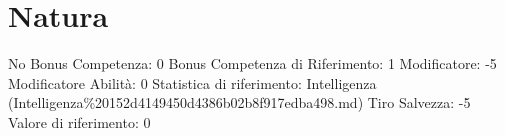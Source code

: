 \section{Natura}\label{natura}

\begin{description}
\tightlist
\item[Tags: ABI]
No Bonus Competenza: 0 Bonus Competenza di Riferimento: 1 Modificatore:
-5 Modificatore Abilità: 0 Statistica di riferimento: Intelligenza
(Intelligenza\%20152d4149450d4386b02b8f917edba498.md) Tiro Salvezza: -5
Valore di riferimento: 0
\end{description}
